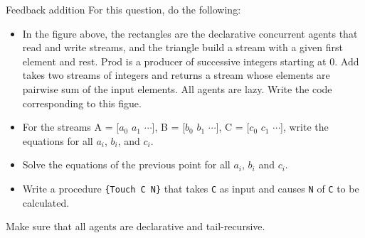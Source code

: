
\def\date{Jun. 20, 2014}

\begin{Q1}{Feedback addition}
  For this question, do the following:
  \begin{itemize}
    \item In the figure above, the rectangles are the declarative concurrent agents that read and write
      streams, and the triangle build a stream with a given first element and rest.
      Prod is a producer of successive integers starting at 0.
      Add takes two streams of integers and returns a stream whose
      elements are pairwise sum of the input elements.
      All agents are lazy.
      Write the code corresponding to this figue.
    \item For the streams
      A = [$a_0$ $a_1$ $\cdots$],
      B = [$b_0$ $b_1$ $\cdots$],
      C = [$c_0$ $c_1$ $\cdots$],
      write the equations for all $a_i$, $b_i$, and $c_i$.
    \item Solve the equations of the previous point for all $a_i$,
      $b_i$ and $c_i$.
    \item Write a procedure \lstinline|{Touch C N}| that takes
      \lstinline|C| as input and causes \lstinline|N| of \lstinline|C|
      to be calculated.
  \end{itemize}
  Make sure that all agents are declarative and tail-recursive.
\end{Q1}

